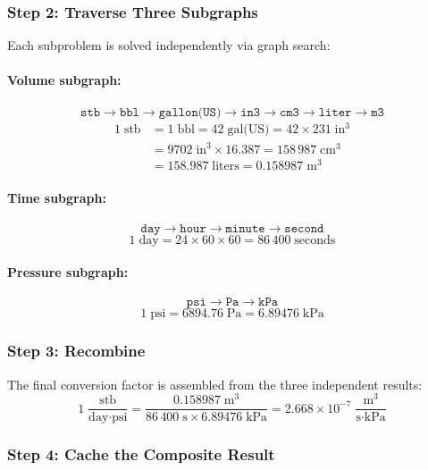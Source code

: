 \documentclass[11pt,a4paper]{report}
\begin{document}
\subsubsection{Step 2: Traverse Three Subgraphs}

Each subproblem is solved independently via graph search:

\paragraph{Volume subgraph:}
\[
\texttt{stb} \rightarrow \texttt{bbl} \rightarrow \texttt{gallon(US)} \rightarrow \texttt{in3} \rightarrow \texttt{cm3} \rightarrow \texttt{liter} \rightarrow \texttt{m3}
\]
\begin{align*}
1\;\text{stb} &= 1\;\text{bbl} = 42\;\text{gal(US)} = 42 \times 231\;\text{in}^3 \\
&= 9702\;\text{in}^3 \times 16.387 = 158\,987\;\text{cm}^3 \\
&= 158.987\;\text{liters} = 0.158987\;\text{m}^3
\end{align*}

\paragraph{Time subgraph:}
\[
\texttt{day} \rightarrow \texttt{hour} \rightarrow \texttt{minute} \rightarrow \texttt{second}
\]
\[
1\;\text{day} = 24 \times 60 \times 60 = 86\,400\;\text{seconds}
\]

\paragraph{Pressure subgraph:}
\[
\texttt{psi} \rightarrow \texttt{Pa} \rightarrow \texttt{kPa}
\]
\[
1\;\text{psi} = 6894.76\;\text{Pa} = 6.89476\;\text{kPa}
\]

\subsubsection{Step 3: Recombine}

The final conversion factor is assembled from the three independent results:
\[
1\;\frac{\text{stb}}{\text{day} \cdot \text{psi}} = \frac{0.158987\;\text{m}^3}{86\,400\;\text{s} \times 6.89476\;\text{kPa}} = 2.668 \times 10^{-7}\;\frac{\text{m}^3}{\text{s} \cdot \text{kPa}}
\]

\subsubsection{Step 4: Cache the Composite Result}
\end{document}
